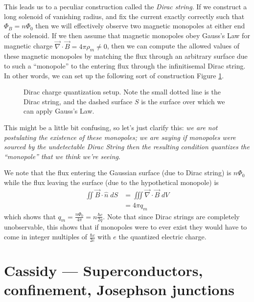 \documentclass[12pt]{article}
\begin{document}
This leads us to a peculiar construction called the \emph{Dirac string}. If we construct a long solenoid of vanishing radius, and fix the current exactly correctly such that $\Phi_B = n\Phi_0$ then we will effectively observe two magnetic monopoles at either end of the solenoid. If we then assume that magnetic monopoles obey Gauss's Law for magnetic charge $\vec{\nabla} \cdot \vec{B} = 4\pi\rho_m \neq 0$, then we can compute the allowed values of these magnetic monopoles by matching the flux through an arbitrary surface due to such a ``monopole'' to the entering flux through the infinitisemal Dirac string. In other words, we can set up the following sort of construction Figure \ref{DiracConst}.
\begin{figure}[!h]
    \centering
    \caption{Dirac charge quantization setup. Note the small dotted line is the Dirac string, and the dashed surface $S$ is the surface over which we can apply Gauss's Law.}
    \label{DiracConst}
\end{figure}

This might be a little bit confusing, so let's just clarify this: \emph{we are not postulating the existence of these monopoles; we are saying if monopoles were sourced by the undetectable Dirac String then the resulting condition quantizes the ``monopole'' that we think we're seeing}. 

We note that the flux entering the Gaussian surface (due to Dirac string) is $n\Phi_0$ while the flux leaving the surface (due to the hypothetical monopole) is 
\begin{align}
    \iint \vec{B} \cdot \hat{n} \;dS &= \iiint \vec{\nabla} \cdot \vec{B} \;dV\\
    &= 4\pi q_m
\end{align}
which shows that $q_m = \frac{n\Phi_0}{4\pi} = n\frac{\hbar c}{2q}$. Note that since Dirac strings are completely unobservable, this shows that if monopoles were to ever exist they would have to come in integer multiples of $\frac{\hbar c}{2e}$ with $e$ the quantized electric charge.

\section{Cassidy --- Superconductors, confinement, Josephson junctions}
\end{document}
